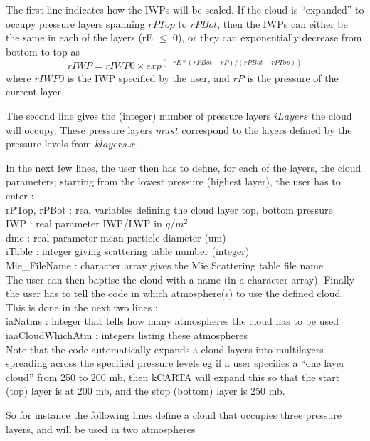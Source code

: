 \documentclass[12pt]{article}
\begin{document}
{{\medskip

The first line indicates how the IWPs will be scaled. If the cloud is 
``expanded'' to occupy pressure layers spanning $rPTop$ to $rPBot$, then the 
IWPs can either be the same in each of the layers (rE $\le$ 0), or they can
exponentially decrease from bottom to top as
\[
                rIWP = rIWP0 \times exp^{(-rE*(rPBot-rP)/(rPBot-rPTop))}
\]
where $rIWP0$ is the IWP specified by the user, and $rP$ is the pressure of the
current layer.

The second line gives the (integer) number of pressure layers $iLayers$ the 
cloud will occupy. These pressure layers $must$ correspond to the layers 
defined by the pressure levels from $klayers.x$.

In the next few lines, the user then has to define, for each of 
the layers, the cloud parameters; starting from the lowest pressure 
(highest layer), the user has to enter : \\
rPTop, rPBot  : real variables defining the cloud layer top, bottom pressure\\
IWP  : real parameter IWP/LWP in $g/m^{2}$\\
dme  : real parameter mean particle diameter (um)\\
iTable : integer giving scattering table number (integer)\\
Mie\_FileName : character array gives the Mie Scattering table file name\\

The user can then baptise the cloud with a name (in a character array). 
Finally the user has to tell the code in which atmosphere(s) to use the 
defined cloud. This is done in the next two lines : \\
iaNatms : integer that tells how many atmospheres the cloud has to be used\\
iaaCloudWhichAtm : integers listing these atmospheres\\

Note that the code automatically expands a cloud layers into multilayers 
spreading across the specified pressure levels eg if a user specifies a 
``one layer cloud'' from 250 to 200 mb, then kCARTA will expand this so that 
the start (top) layer is at 200 mb, and the stop (bottom) layer is 250 mb.

So for instance the following lines define a cloud that occupies three pressure
layers, and will be used in two atmospheres \\

}}
\end{document}

